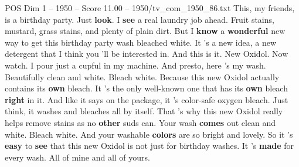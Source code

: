 \begin{textsample}{POS Dim 1 – 1950 – Score 11.00 – 1950/tv\_com\_1950\_86.txt}  \label{ex:f1_pos_002}
This, my friends, is a birthday party.
Just \textbf{look}.
I \textbf{see} a real laundry job ahead.
Fruit stains, mustard, grass stains, and plenty of plain dirt.
But I \textbf{know} a \textbf{wonderful} new way to get this birthday party wash bleached white.
It 's a new idea, a new detergent that I think you 'll be interested in.
And this is it.
New Oxidol.
Now watch.
I pour just a cupful in my machine.
And presto, here 's my wash.
Beautifully clean and white.
Bleach white.
Because this new Oxidol actually contains its \textbf{own} bleach.
It 's the only well-known one that has its \textbf{own} bleach \textbf{right} in it.
And like it says on the package, it 's color-safe oxygen bleach.
Just think, it washes and bleaches all by itself.
That 's why this new Oxidol really helps remove stains as no \textbf{other} suds can.
Your wash \textbf{comes} out clean and white.
Bleach white.
And your washable \textbf{colors} are so bright and lovely.
So it 's \textbf{easy} to \textbf{see} that this new Oxidol is not just for birthday washes.
It 's \textbf{made} for every wash.
All of mine and all of yours.

\end{textsample}
